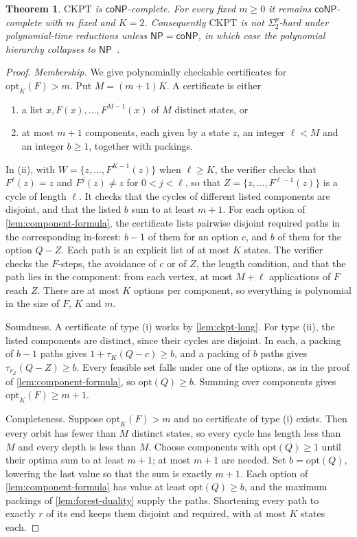 \documentclass[11pt]{article}
\newtheorem{theorem}{Theorem}[section]
\theoremstyle{definition}
\theoremstyle{remark}
\numberwithin{equation}{section}
\begin{document}
\begin{theorem}\label{thm:ckpt-conp}
$\mathrm{CKPT}$ is $\mathsf{coNP}$-complete.  For every fixed $m\geq0$ it
remains $\mathsf{coNP}$-complete with $m$ fixed and $K=2$.  Consequently
$\mathrm{CKPT}$ is not $\Sigma_2^p$-hard under polynomial-time reductions
unless $\mathsf{NP}=\mathsf{coNP}$, in which case the polynomial
hierarchy collapses to $\mathsf{NP}$~\cite{Stockmeyer76}.
\end{theorem}

\begin{proof}
\emph{Membership.}  We give polynomially checkable certificates for
$\mathrm{opt}_K(F)>m$.  Put $M=(m+1)K$.  A certificate is either
\begin{enumerate}
\item[(i)] a list $x,F(x),\ldots,F^{M-1}(x)$ of $M$ distinct states, or
\item[(ii)] at most $m+1$ components, each given by a state $z$, an
  integer $\ell<M$ and an integer $b\geq1$, together with packings.
\end{enumerate}
In (ii), with $W=\{z,\ldots,F^{K-1}(z)\}$ when $\ell\geq K$, the
verifier checks that $F^\ell(z)=z$ and $F^j(z)\neq z$ for
$0<j<\ell$, so that $Z=\{z,\ldots,F^{\ell-1}(z)\}$ is a cycle of length
$\ell$.  It checks that the cycles of different listed components are
disjoint, and that the listed $b$ sum to at least $m+1$.  For each option
of \cref{lem:component-formula}, the certificate lists pairwise disjoint
required paths in the corresponding in-forest: $b-1$ of them for an
option $c$, and $b$ of them for the option $Q-Z$.  Each path is an
explicit list of at most $K$ states.  The verifier checks the $F$-steps,
the avoidance of $c$ or of $Z$, the length condition, and that the
path lies in the component: from each vertex, at most $M+\ell$
applications of $F$ reach $Z$.  There are at most $K$ options per
component, so everything is polynomial in the size of $F$, $K$ and $m$.

Soundness.  A certificate of type (i) works by \cref{lem:ckpt-long}.
For type (ii), the listed components are distinct, since their cycles are
disjoint.  In each, a packing of $b-1$ paths gives
$1+\tau_K(Q-c)\geq b$, and a packing of $b$ paths gives
$\tau_{r_Z}(Q-Z)\geq b$.  Every feasible set falls under one of the
options, as in the proof of \cref{lem:component-formula}, so
$\mathrm{opt}(Q)\geq b$.  Summing over components gives
$\mathrm{opt}_K(F)\geq m+1$.

Completeness.  Suppose $\mathrm{opt}_K(F)>m$ and no certificate of type
(i) exists.  Then every orbit has fewer than $M$ distinct states, so
every cycle has length less than $M$ and every depth is less than $M$.
Choose components with $\mathrm{opt}(Q)\geq1$ until their optima sum to
at least $m+1$; at most $m+1$ are needed.  Set $b=\mathrm{opt}(Q)$,
lowering the last value so that the sum is exactly $m+1$.  Each option of
\cref{lem:component-formula} has value at least $\mathrm{opt}(Q)\geq b$,
and the maximum packings of \cref{lem:forest-duality} supply the paths.
Shortening every path to exactly $r$ of its end keeps them disjoint and
required, with at most $K$ states each.


\end{proof}
\end{document}
